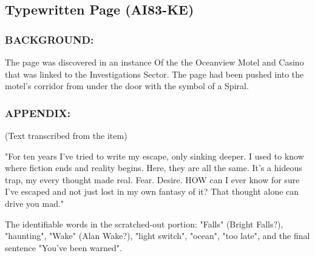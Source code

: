 \subsection*{Typewritten Page (AI83-KE)}
\subsubsection*{BACKGROUND:}
\par The page was discovered in an instance Of the the Oceanview
Motel and Casino that was linked to the Investigations Sector. The
page had been pushed into the motel's corridor from under the
door with the symbol of a Spiral. 
\subsubsection*{APPENDIX:}
\par (Text transcribed from the item)
\par "For ten years I've tried to write my escape, only sinking deeper. I
used to know where fiction ends and reality begins. Here, they
are all the same. It's a hideous trap, my every thought made real.
Fear. Desire. HOW can I ever know for sure I've escaped and not
just lost in my own fantasy of it? That thought alone can drive you
mad."
\par The identifiable words in the scratched-out portion:
"Falls" (Bright Falls?), "haunting", "Wake" (Alan Wake?), "light
switch", "ocean", "too late", and the final sentence "You've been
warned".